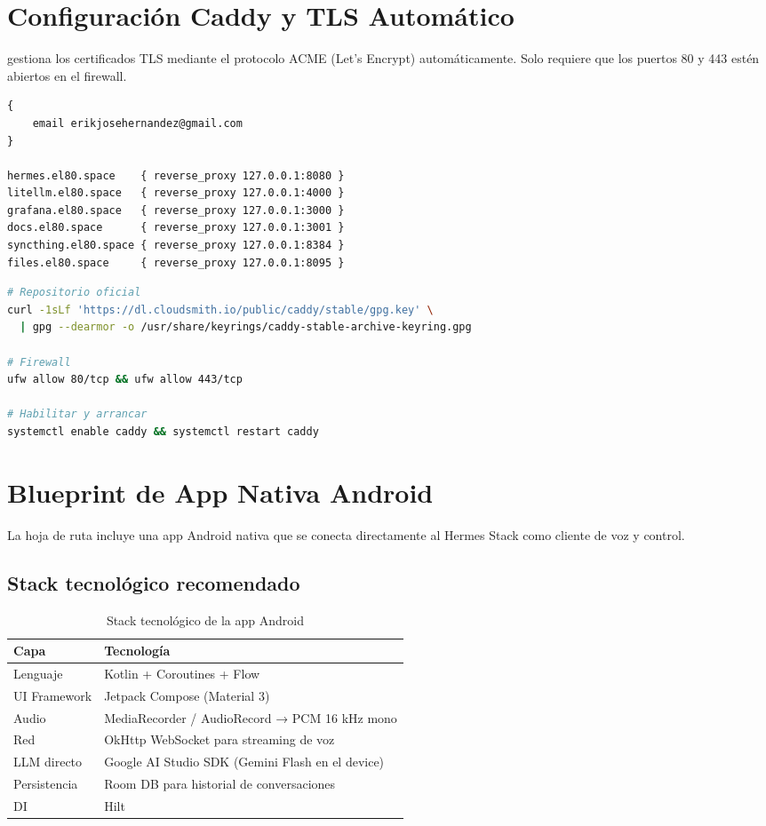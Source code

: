 \section{Configuración Caddy y TLS Automático}

 gestiona los certificados TLS mediante el protocolo ACME
(Let's Encrypt) automáticamente. Solo requiere que los puertos 80 y 443
estén abiertos en el firewall.

\begin{lstlisting}[caption=/etc/caddy/Caddyfile completo]
{
    email erikjosehernandez@gmail.com
}

hermes.el80.space    { reverse_proxy 127.0.0.1:8080 }
litellm.el80.space   { reverse_proxy 127.0.0.1:4000 }
grafana.el80.space   { reverse_proxy 127.0.0.1:3000 }
docs.el80.space      { reverse_proxy 127.0.0.1:3001 }
syncthing.el80.space { reverse_proxy 127.0.0.1:8384 }
files.el80.space     { reverse_proxy 127.0.0.1:8095 }
\end{lstlisting}

\begin{lstlisting}[language=bash,caption=Instalación de Caddy (setup-caddy.sh)]
# Repositorio oficial
curl -1sLf 'https://dl.cloudsmith.io/public/caddy/stable/gpg.key' \
  | gpg --dearmor -o /usr/share/keyrings/caddy-stable-archive-keyring.gpg

# Firewall
ufw allow 80/tcp && ufw allow 443/tcp

# Habilitar y arrancar
systemctl enable caddy && systemctl restart caddy
\end{lstlisting}

\section{Blueprint de App Nativa Android}

La hoja de ruta incluye una app Android nativa que se conecta directamente
al Hermes Stack como cliente de voz y control.

\subsection{Stack tecnológico recomendado}

\begin{table}[h]
\centering
\caption{Stack tecnológico de la app Android}
\begin{tabularx}{\textwidth}{lX}
\toprule
\textbf{Capa} & \textbf{Tecnología} \\
\midrule
Lenguaje      & Kotlin + Coroutines + Flow \\
UI Framework  & Jetpack Compose (Material 3) \\
Audio         & MediaRecorder / AudioRecord → PCM 16 kHz mono \\
Red           & OkHttp WebSocket para streaming de voz \\
LLM directo   & Google AI Studio SDK (Gemini Flash en el device) \\
Persistencia  & Room DB para historial de conversaciones \\
DI            & Hilt \\
\bottomrule
\end{tabularx}
\end{table}

